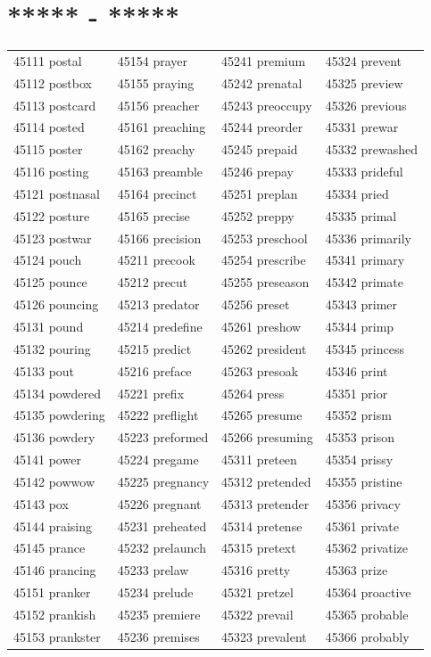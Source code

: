 \documentclass[10pt, oneside]{book}
\begin{document}
\begin{table}[h]
	\centering
	\section*{***** - *****}
	\begin{tabular}{l l l l}
45111 postal &45154 prayer &45241 premium &45324 prevent\\
45112 postbox &45155 praying &45242 prenatal &45325 preview\\
45113 postcard &45156 preacher &45243 preoccupy &45326 previous\\
45114 posted &45161 preaching &45244 preorder &45331 prewar\\
45115 poster &45162 preachy &45245 prepaid &45332 prewashed\\
45116 posting &45163 preamble &45246 prepay &45333 prideful\\
45121 postnasal &45164 precinct &45251 preplan &45334 pried\\
45122 posture &45165 precise &45252 preppy &45335 primal\\
45123 postwar &45166 precision &45253 preschool &45336 primarily\\
45124 pouch &45211 precook &45254 prescribe &45341 primary\\
45125 pounce &45212 precut &45255 preseason &45342 primate\\
45126 pouncing &45213 predator &45256 preset &45343 primer\\
45131 pound &45214 predefine &45261 preshow &45344 primp\\
45132 pouring &45215 predict &45262 president &45345 princess\\
45133 pout &45216 preface &45263 presoak &45346 print\\
45134 powdered &45221 prefix &45264 press &45351 prior\\
45135 powdering &45222 preflight &45265 presume &45352 prism\\
45136 powdery &45223 preformed &45266 presuming &45353 prison\\
45141 power &45224 pregame &45311 preteen &45354 prissy\\
45142 powwow &45225 pregnancy &45312 pretended &45355 pristine\\
45143 pox &45226 pregnant &45313 pretender &45356 privacy\\
45144 praising &45231 preheated &45314 pretense &45361 private\\
45145 prance &45232 prelaunch &45315 pretext &45362 privatize\\
45146 prancing &45233 prelaw &45316 pretty &45363 prize\\
45151 pranker &45234 prelude &45321 pretzel &45364 proactive\\
45152 prankish &45235 premiere &45322 prevail &45365 probable\\
45153 prankster &45236 premises &45323 prevalent &45366 probably\\
	\end{tabular}
 \end{table}
\end{document}
